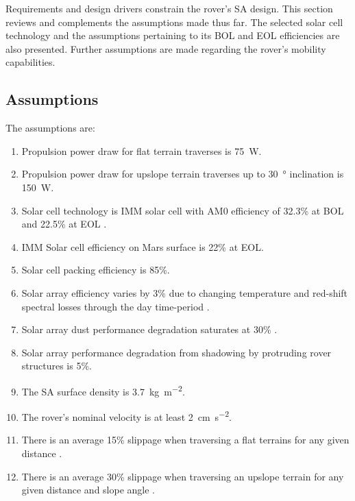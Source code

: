 Requirements and design drivers constrain the rover's \ac{SA} design. This section reviews and complements the assumptions made thus far. The selected solar cell technology and the assumptions pertaining to its \ac{BOL} and \ac{EOL} efficiencies are also presented. Further assumptions are made regarding the rover's mobility capabilities.

\subsection{Assumptions}
\label{sec:RequirementsAndDesignDrivers:Assumptions}
The assumptions are:

\resetLeadingZeroCounter
\begin{enumerate}[leftmargin=1.31cm, label=\zeroLeadCounter{A}]
    \item Propulsion power draw for flat terrain traverses is \SI{75}{\watt}.
    \item Propulsion power draw for upslope terrain traverses up to \SI{30}{\degree} inclination is \SI{150}{\watt}.
    \item Solar cell technology is \ac{IMM} solar cell with AM0 efficiency of 32.3\% at \ac{BOL} and 22.5\% at \ac{EOL} .
    \item \label{itm:ass:solar_cell_efficiency} \ac{IMM} Solar cell efficiency on Mars surface is 22\% at \ac{EOL}.
    \item \label{itm:ass:packing_efficiency} Solar cell packing efficiency is 85\%.
    \item \label{itm:ass:red_shifts} Solar array efficiency varies by 3\% due to changing temperature and red-shift spectral losses through the day time-period .
    \item \label{itm:ass:dust_deposition_saturation} Solar array dust performance degradation saturates at 30\% .
    \item \label{itm:ass:protruding_shadowing} Solar array performance degradation from shadowing by protruding rover structures is 5\%.
    \item \label{itm:ass:sa_surface_density} The \ac{SA} surface density is \SI{3.7}{kg.m^{-2}}.
    \item The rover's nominal velocity is at least \SI{2}{cm.s^{-2}}.
    \item There is an average 15\% slippage when traversing a flat terrains for any given distance .
    \item There is an average 30\% slippage when traversing an upslope terrain for any given distance and slope angle .
\end{enumerate}

